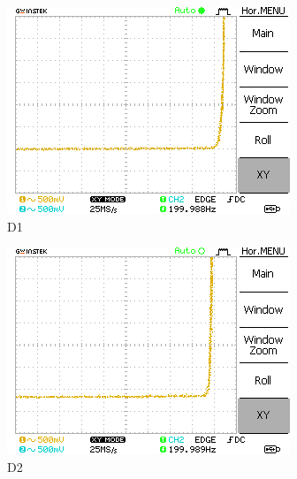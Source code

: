 \begin{figure}[H]
    \centering
    \begin{subfigure}[b]{0.45\textwidth}
        \includegraphics[width=\textwidth]{figs/2/DS0000.png}
        \caption{D1}
        \label{fig:2_D1}
    \end{subfigure}
    \hfill
    \begin{subfigure}[b]{0.45\textwidth}
        \includegraphics[width=\textwidth]{figs/2/DS0001.png}
        \caption{D2}
        \label{fig:2_D2}
    \end{subfigure}
    \vspace{0.5em}
    \begin{subfigure}[b]{0.45\textwidth}

\end{subfigure}
\end{figure}
